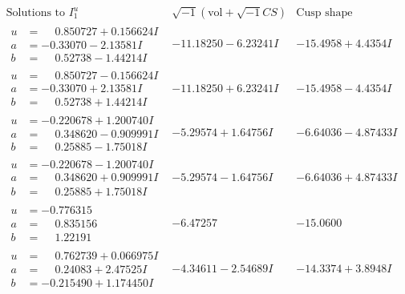 \documentclass[1p]{elsarticle_modified}
\theoremstyle{definition}
\newcommand{\I}{\sqrt{-1}}
\begin{document}
$$\begin{array}{c|c|c}  
\text{Solutions to }I^u_{1}& \I (\text{vol} + \sqrt{-1}CS) & \text{Cusp shape}\\
 \hline 
\begin{aligned}
u &= \phantom{-}0.850727 + 0.156624 I \\
a &= -0.33070 - 2.13581 I \\
b &= \phantom{-}0.52738 - 1.44214 I\end{aligned}
 & -11.18250 - 6.23241 I & -15.4958 + 4.4354 I \\ \hline\begin{aligned}
u &= \phantom{-}0.850727 - 0.156624 I \\
a &= -0.33070 + 2.13581 I \\
b &= \phantom{-}0.52738 + 1.44214 I\end{aligned}
 & -11.18250 + 6.23241 I & -15.4958 - 4.4354 I \\ \hline\begin{aligned}
u &= -0.220678 + 1.200740 I \\
a &= \phantom{-}0.348620 - 0.909991 I \\
b &= \phantom{-}0.25885 - 1.75018 I\end{aligned}
 & -5.29574 + 1.64756 I & -6.64036 - 4.87433 I \\ \hline\begin{aligned}
u &= -0.220678 - 1.200740 I \\
a &= \phantom{-}0.348620 + 0.909991 I \\
b &= \phantom{-}0.25885 + 1.75018 I\end{aligned}
 & -5.29574 - 1.64756 I & -6.64036 + 4.87433 I \\ \hline\begin{aligned}
u &= -0.776315\phantom{ +0.000000I} \\
a &= \phantom{-}0.835156\phantom{ +0.000000I} \\
b &= \phantom{-}1.22191\phantom{ +0.000000I}\end{aligned}
 & -6.47257\phantom{ +0.000000I} & -15.0600\phantom{ +0.000000I} \\ \hline\begin{aligned}
u &= \phantom{-}0.762739 + 0.066975 I \\
a &= \phantom{-}0.24083 + 2.47525 I \\
b &= -0.215490 + 1.174450 I\end{aligned}
 & -4.34611 - 2.54689 I & -14.3374 + 3.8948 I \\ \hline\begin{aligned}

\end{aligned}
\end{array}$$
\end{document}
